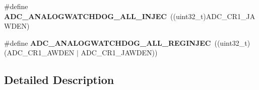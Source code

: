 \begin{DoxyCompactItemize}
\item 
\mbox{\label{group___a_d_c__analog__watchdog__mode_gacf2ee0d67e728fd6258270b239823713}} 
\#define {\bfseries A\+D\+C\+\_\+\+A\+N\+A\+L\+O\+G\+W\+A\+T\+C\+H\+D\+O\+G\+\_\+\+A\+L\+L\+\_\+\+I\+N\+J\+EC}~((uint32\+\_\+t)A\+D\+C\+\_\+\+C\+R1\+\_\+\+J\+A\+W\+D\+EN)
\item 
\mbox{\label{group___a_d_c__analog__watchdog__mode_ga8ab72f0e7dfee943acb5cccacff7e4a0}} 
\#define {\bfseries A\+D\+C\+\_\+\+A\+N\+A\+L\+O\+G\+W\+A\+T\+C\+H\+D\+O\+G\+\_\+\+A\+L\+L\+\_\+\+R\+E\+G\+I\+N\+J\+EC}~((uint32\+\_\+t)(A\+D\+C\+\_\+\+C\+R1\+\_\+\+A\+W\+D\+EN $\vert$ A\+D\+C\+\_\+\+C\+R1\+\_\+\+J\+A\+W\+D\+EN))
\end{DoxyCompactItemize}


\subsection{Detailed Description}
